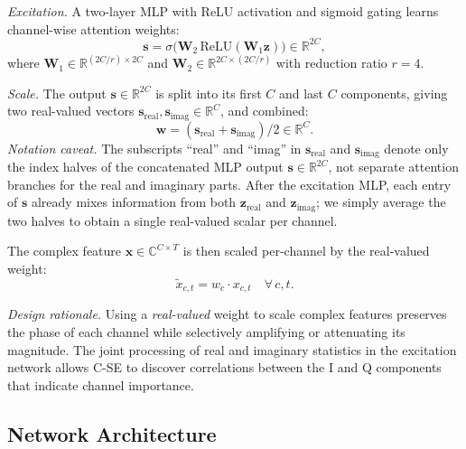 \documentclass[twocolumn,english]{svjour3}
\begin{document}
\emph{Excitation.} A two-layer MLP with ReLU activation and sigmoid gating learns channel-wise attention weights:
\begin{equation}
    \mathbf{s} = \sigma\big(\mathbf{W}_2 \, \text{ReLU}(\mathbf{W}_1 \mathbf{z})\big) \in \mathbb{R}^{2C},
\end{equation}
where $\mathbf{W}_1 \in \mathbb{R}^{(2C/r) \times 2C}$ and $\mathbf{W}_2 \in \mathbb{R}^{2C \times (2C/r)}$ with reduction ratio $r=4$.

\emph{Scale.} The output $\mathbf{s} \in \mathbb{R}^{2C}$ is split into its first $C$ and last $C$ components, giving two real-valued vectors $\mathbf{s}_{\text{real}}, \mathbf{s}_{\text{imag}} \in \mathbb{R}^{C}$, and combined:
\begin{equation}
    \mathbf{w} = (\mathbf{s}_{\text{real}} + \mathbf{s}_{\text{imag}}) / 2 \in \mathbb{R}^{C}.
    \label{eq:scale}
\end{equation}
\emph{Notation caveat.} The subscripts ``real'' and ``imag'' in $\mathbf{s}_{\text{real}}$ and $\mathbf{s}_{\text{imag}}$ denote only the index halves of the concatenated MLP output $\mathbf{s} \in \mathbb{R}^{2C}$, not separate attention branches for the real and imaginary parts. After the excitation MLP, each entry of $\mathbf{s}$ already mixes information from both $\mathbf{z}_{\text{real}}$ and $\mathbf{z}_{\text{imag}}$; we simply average the two halves to obtain a single real-valued scalar per channel.

The complex feature $\mathbf{x} \in \mathbb{C}^{C \times T}$ is then scaled per-channel by the real-valued weight:
\begin{equation}
    \tilde{x}_{c,t} = w_c \cdot x_{c,t} \quad \forall\, c, t.
\end{equation}

\emph{Design rationale.} Using a \emph{real-valued} weight to scale complex features preserves the phase of each channel while selectively amplifying or attenuating its magnitude. The joint processing of real and imaginary statistics in the excitation network allows C-SE to discover correlations between the I and Q components that indicate channel importance.

\subsection{Network Architecture}
\end{document}
